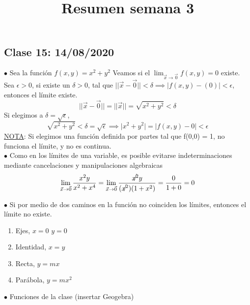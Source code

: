 \documentclass[amsmath,amssymb]{article}
\title{Resumen semana 3}
\begin{document}
\subsection{Clase 15: 14/08/2020}

\noindent $\bullet$ Sea la función $f(x,y) = x^2+y^2$
Veamos si el $\displaystyle{\lim_{\vec{x} \to\vec{0}}}f(x,y) = 0$ existe. \\
Sea $\epsilon > 0$, si existe un $\delta>0$, tal que $\lvert \lvert \vec{x} - \vec{0} \rvert \rvert< \delta \implies \lvert f(x,y) - (0) \rvert < \epsilon$, entonces el límite existe.\\
$$\lvert \lvert \vec{x} - \vec{0} \rvert \rvert=\lvert \lvert \vec{x}  \rvert \rvert=\sqrt{x^2+y^2}<\delta$$
Si elegimos a $\delta = \sqrt{\epsilon}$, $$\sqrt{x^2+y^2}<\delta=\sqrt{\epsilon} \implies \lvert x^2+y^2 \rvert = \lvert f(x,y) - 0 \rvert < \epsilon$$
\underline{NOTA}: Si elegimos una función definida por partes tal que f(0,0) = 1, no funciona el límite, y no es continua.\\ 

\noindent$\bullet$ Como en los límites de una variable, es posible evitarse indeterminaciones mediante cancelaciones y manipulaciones algebraicas
$$ \lim_{\vec{x} \to\vec{0}} \frac{x^2 y}{x^2+x^4}= \lim_{\vec{x} \to\vec{0}} \frac{\slashed{x^2} y}{(\slashed{x^2})(1+x^2)}=\frac{0}{1+0}=0$$

\noindent $\bullet$ Si por medio de dos caminos en la función no coinciden los límites, entonces el límite no existe.

\begin{enumerate}
    \item Ejes, $x=0$ $y=0$
    \item Identidad, $x=y$
    \item Recta, $y=mx$
    \item Parábola, $y=mx^2$
\end{enumerate}

\noindent $\bullet$ Funciones de la clase (insertar Geogebra)


\end{document}
